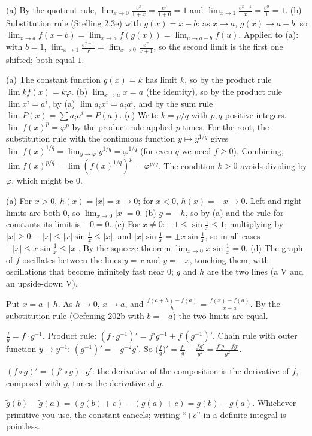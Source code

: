  (a) By the quotient rule, $\lim_{x\to0}\frac{e^x}{1+x}=\frac{e^0}{1+0}=1$ and $\lim_{x\to1}\frac{e^{x-1}}x=\frac{e^0}1=1$. (b) Substitution rule (Stelling 2.3e) with $g(x)=x-b$: as $x\to a$, $g(x)\to a-b$, so $\lim_{x\to a}f(x-b)=\lim_{x\to a}f(g(x))=\lim_{u\to a-b}f(u)$. Applied to (a): with $b=1$, $\lim_{x\to1}\frac{e^{x-1}}{x}=\lim_{x\to0}\frac{e^{x}}{x+1}$, so the second limit is the first one shifted; both equal $1$.

 (a) The constant function $g(x)=k$ has limit $k$, so by the product rule $\lim kf(x)=k\varphi$. (b) $\lim_{x\to a}x=a$ (the identity), so by the product rule $\lim x^i=a^i$, by (a) $\lim a_ix^i=a_ia^i$, and by the sum rule $\lim P(x)=\sum a_ia^i=P(a)$. (c) Write $k=p/q$ with $p,q$ positive integers. $\lim f(x)^p=\varphi^p$ by the product rule applied $p$ times. For the root, the substitution rule with the continuous function $y\mapsto y^{1/q}$ gives $\lim f(x)^{1/q}=\lim_{y\to\varphi}y^{1/q}=\varphi^{1/q}$ (for even $q$ we need $f\ge0$). Combining, $\lim f(x)^{p/q}=\lim(f(x)^{1/q})^p=\varphi^{p/q}$. The condition $k>0$ avoids dividing by $\varphi$, which might be $0$.

 (a) For $x>0$, $h(x)=|x|=x\to0$; for $x<0$, $h(x)=-x\to0$. Left and right limits are both $0$, so $\lim_{x\to0}|x|=0$. (b) $g=-h$, so by (a) and the rule for constants its limit is $-0=0$. (c) For $x\ne0$: $-1\le\sin\frac1x\le1$; multiplying by $|x|\ge0$: $-|x|\le|x|\sin\frac1x\le|x|$, and $|x|\sin\frac1x=\pm x\sin\frac1x$, so in all cases $-|x|\le x\sin\frac1x\le|x|$. By the squeeze theorem $\lim_{x\to0}x\sin\frac1x=0$. (d) The graph of $f$ oscillates between the lines $y=x$ and $y=-x$, touching them, with oscillations that become infinitely fast near $0$; $g$ and $h$ are the two lines (a V and an upside-down V).

 Put $x=a+h$. As $h\to0$, $x\to a$, and $\frac{f(a+h)-f(a)}h=\frac{f(x)-f(a)}{x-a}$. By the substitution rule (Oefening 202b with $b=-a$) the two limits are equal.

 $\frac fg=f\cdot g^{-1}$. Product rule: $(f\cdot g^{-1})'=f'g^{-1}+f\,(g^{-1})'$. Chain rule with outer function $y\mapsto y^{-1}$: $(g^{-1})'=-g^{-2}g'$. So $\big(\frac fg\big)'=\frac{f'}g-\frac{fg'}{g^2}=\frac{f'g-fg'}{g^2}$.

 $(f\circ g)'=(f'\circ g)\cdot g'$: the derivative of the composition is the derivative of $f$, composed with $g$, times the derivative of $g$.

 $\tilde g(b)-\tilde g(a)=(g(b)+c)-(g(a)+c)=g(b)-g(a)$. Whichever primitive you use, the constant cancels; writing ``$+c$'' in a definite integral is pointless.

